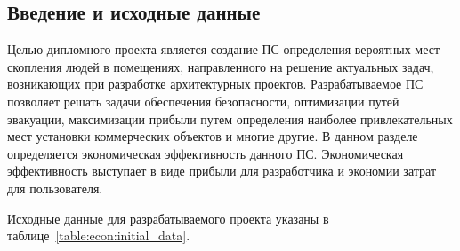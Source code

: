 






\FPround{}


\subsection{Введение и исходные данные}

Целью дипломного проекта является создание ПС определения вероятных мест скопления людей в помещениях,
направленного на решение актуальных задач, возникающих при разработке архитектурных проектов.
Разрабатываемое ПС позволяет решать задачи обеспечения безопасности, оптимизации путей эвакуации,
максимизации прибыли путем определения наиболее привлекательных мест установки коммерческих объектов и многие другие.
В данном разделе определяется экономическая эффективность данного ПС.
Экономическая эффективность выступает в виде прибыли для разработчика и экономии затрат для пользователя.

Исходные данные для разрабатываемого проекта указаны в таблице~\ref{table:econ:initial_data}.

